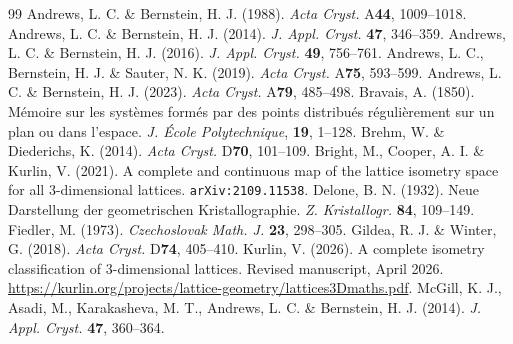 \documentclass[11pt]{article}
\begin{document}
\begin{thebibliography}{99}
\small
{} Andrews, L. C. \& Bernstein, H. J. (1988). \textit{Acta Cryst.} A\textbf{44}, 1009--1018.
 Andrews, L. C. \& Bernstein, H. J. (2014). \textit{J. Appl. Cryst.} \textbf{47}, 346--359.
 Andrews, L. C. \& Bernstein, H. J. (2016). \textit{J. Appl. Cryst.} \textbf{49}, 756--761.
 Andrews, L. C., Bernstein, H. J. \& Sauter, N. K. (2019). \textit{Acta Cryst.} A\textbf{75}, 593--599.
 Andrews, L. C. \& Bernstein, H. J. (2023). \textit{Acta Cryst.} A\textbf{79}, 485--498.
 Bravais, A. (1850). M\'emoire sur les syst\`emes form\'es par des points distribu\'es r\'eguli\`erement sur un plan ou dans l'espace. \textit{J. \'{E}cole Polytechnique}, \textbf{19}, 1--128.
 Brehm, W. \& Diederichs, K. (2014). \textit{Acta Cryst.} D\textbf{70}, 101--109.
 Bright, M., Cooper, A. I. \& Kurlin, V. (2021). A complete and continuous map of the lattice isometry space for all 3-dimensional lattices. \texttt{arXiv:2109.11538}.
 Delone, B. N. (1932). Neue Darstellung der geometrischen Kristallographie. \textit{Z. Kristallogr.} \textbf{84}, 109--149.
 Fiedler, M. (1973). \textit{Czechoslovak Math. J.} \textbf{23}, 298--305.
 Gildea, R. J. \& Winter, G. (2018). \textit{Acta Cryst.} D\textbf{74}, 405--410.
 Kurlin, V. (2026). A complete isometry classification of 3-dimensional lattices. Revised manuscript, April 2026. \url{https://kurlin.org/projects/lattice-geometry/lattices3Dmaths.pdf}.
 McGill, K. J., Asadi, M., Karakasheva, M. T., Andrews, L. C. \& Bernstein, H. J. (2014). \textit{J. Appl. Cryst.} \textbf{47}, 360--364.
\end{thebibliography}
\end{document}
